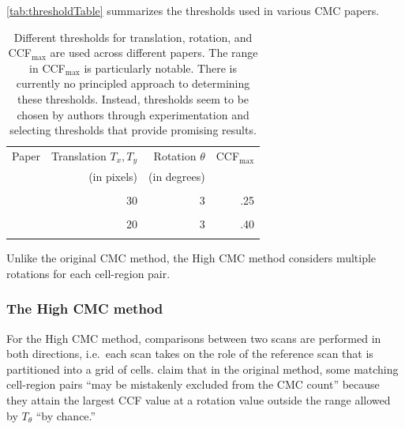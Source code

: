 \autoref{tab:thresholdTable} summarizes the thresholds used in various
CMC papers.

\begin{table}[ht]
    \centering
    \begin{tabular}{|lrrr|}
      \hline
        Paper & Translation $T_x, T_y$ & Rotation $\theta$ & CCF$_{\max}$ \\
              & (in pixels) & (in degrees) \\
        \hline
        \cellcolor{lightgray}{\citet{song_3d_2014}} & \cellcolor{lightgray}{20} & 
        \cellcolor{lightgray}{6} & \cellcolor{lightgray}{.60} \\
        
        \citet{tong_fired_2014} & 30 & 3 & .25 \\
        
        \cellcolor{lightgray}{\citet{tong_improved_2015}} & \cellcolor{lightgray}{15} & 
        \cellcolor{lightgray}{3} & \cellcolor{lightgray}{.55} \\
        
        \citet{chen_convergence_2017} & 20 & 3 & .40 \\
        
        \cellcolor{lightgray}{\citet{song_estimating_2018}} & \cellcolor{lightgray}{20} & 
        \cellcolor{lightgray}{6} & \cellcolor{lightgray}{.50}\\
        \hline
    \end{tabular}
    \caption{Different thresholds for translation, rotation, and CCF$_{\max}$ are used across different papers. The range in CCF$_{\max}$ is particularly notable. There is currently no principled approach to determining these thresholds. Instead, thresholds seem to be chosen by authors through experimentation and selecting thresholds that provide promising results.}
    \label{tab:thresholdTable}
\end{table}

Unlike the original CMC method, the High CMC method considers multiple
rotations for each cell-region pair.

\hypertarget{highCMCMethod}{%
\subsubsection{The High CMC method}\label{highCMCMethod}}

For the High CMC method, comparisons between two scans are performed in
both directions, i.e.~each scan takes on the role of the reference scan
that is partitioned into a grid of cells. \citet{tong_improved_2015}
claim that in the original method, some matching cell-region pairs ``may
be mistakenly excluded from the CMC count'' because they attain the
largest CCF value at a rotation value outside the range allowed by
\(T_\theta\) ``by chance.''

